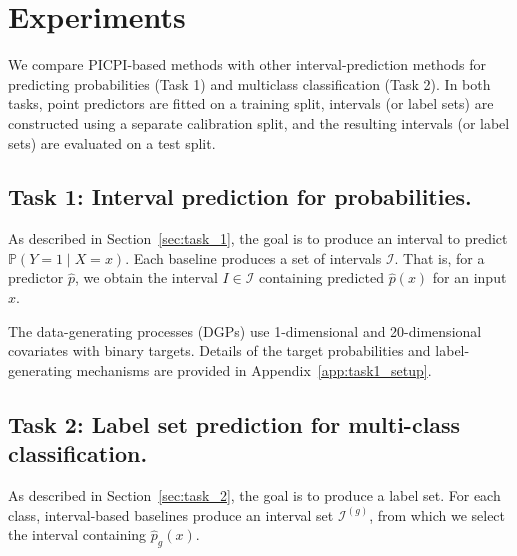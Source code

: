 \documentclass[11pt]{article}
\theoremstyle{statplain}
\theoremstyle{statdefinition}
\newcommand{\PP}{\mathbb{P}}
\newcommand{\0}{\mathbf{0}}
\newcommand{\I}{\mathcal{I}}
\newcommand{\interval}{I} %
\newcommand{\intervalset}{\I} %
\newcommand{\titleShort}{PICPI\xspace}
\begin{document}
\section{Experiments}\label{sec:experiment}




We compare \titleShort-based methods with other interval-prediction methods for predicting probabilities (Task 1) and multiclass classification (Task 2). In both tasks, point predictors are fitted on a training split, intervals (or label sets) are constructed using a separate calibration split, and the resulting intervals (or label sets) are evaluated on a test split. 

\subsection{Task 1: Interval prediction for probabilities.}

As described in Section~\ref{sec:task_1}, the goal is to produce an interval to predict $\PP (Y=1\mid X=x)$. Each baseline produces a set of intervals $\intervalset$. That is, for a predictor $\hat{p}$, we obtain the interval $\interval\in\intervalset$ containing predicted $\hat p(x)$ for an input $x$. 


The data-generating processes (DGPs) use 1-dimensional and 20-dimensional covariates with binary targets. Details of the target probabilities and label-generating mechanisms are provided in Appendix~\ref{app:task1_setup}.



\subsection{Task 2: Label set prediction for multi-class classification.}

As described in Section~\ref{sec:task_2}, the goal is to produce a label set. For each class, interval-based baselines produce an interval set $\intervalset^{(g)}$, from which we select the interval containing $\hat p_g(x)$. 
\end{document}
